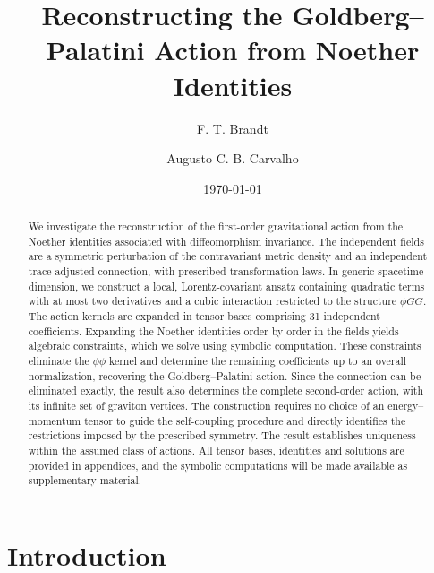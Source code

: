 \documentclass[prd,aps,preprint,superscriptaddress,nofootinbib,amsmath,amssymb,eqsecnum]{revtex4-2}
\begin{document}
\title{Reconstructing the Goldberg--Palatini Action from Noether Identities}

\author{F. T. Brandt}
\author{Augusto C. B. Carvalho}

\date{\today}

\begin{abstract}
We investigate the reconstruction of the first-order gravitational action from the Noether
identities associated with diffeomorphism invariance. The independent fields are a symmetric
perturbation of the contravariant metric density and an independent trace-adjusted
connection, with prescribed transformation laws. In generic spacetime dimension, we construct a local,
Lorentz-covariant ansatz containing quadratic terms with at most two derivatives and a cubic
interaction restricted to the structure $\phi GG$. The action kernels are expanded in tensor
bases comprising 31 independent coefficients. Expanding the Noether identities order by order
in the fields yields algebraic constraints, which we solve using symbolic computation. These
constraints eliminate the $\phi\phi$ kernel and determine the remaining coefficients up to an
overall normalization, recovering the Goldberg--Palatini action. Since the connection can be
eliminated exactly, the result also determines the complete
second-order action, with its infinite set of graviton vertices. The construction requires no
choice of an energy--momentum tensor to guide the self-coupling procedure and directly
identifies the restrictions imposed by the prescribed symmetry. The result establishes
uniqueness within the assumed class of actions. All tensor bases, identities and solutions are
provided in appendices, and the symbolic computations will be made available as
supplementary material.
\end{abstract}

\maketitle


\section{Introduction}
\label{sec:introduction}
\end{document}
